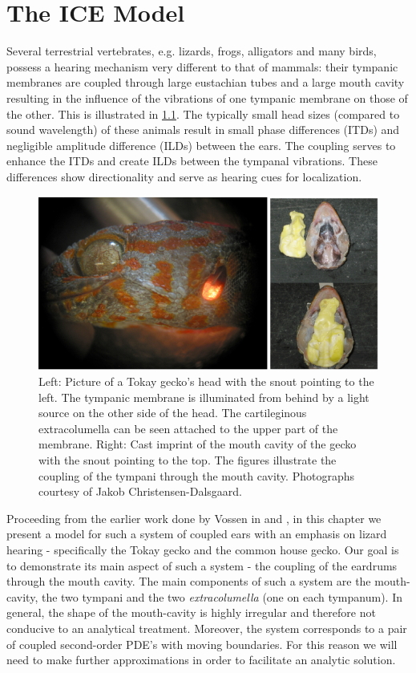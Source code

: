 \chapter{The ICE Model}
Several terrestrial vertebrates, e.g. lizards, frogs, alligators and many birds, possess a hearing mechanism very different to
that of mammals: their tympanic membranes are coupled through large eustachian tubes and a large mouth cavity resulting in the influence of the vibrations of one tympanic membrane
on those of the other. This is illustrated in \ref{geckohead}. The typically small head sizes (compared to sound wavelength) of these animals result in
small phase differences (ITDs) and negligible amplitude difference (ILDs) between the ears. The coupling serves to enhance the ITDs and create ILDs
between the tympanal vibrations. These differences show directionality and serve as hearing cues for localization.

\begin{figure}[ht!]
 \centering
 \includegraphics[width=.85\linewidth]{Diagrams/geckohead1.png}
 \caption[Illustration of a gecko's head]{Left: Picture of a Tokay gecko's head with the snout pointing to the left. The tympanic membrane is illuminated from behind by
 a light source on the other side of the head. The cartileginous extracolumella can be seen attached to the upper part of the membrane.
 Right: Cast imprint of the mouth cavity of the gecko with the snout pointing to the top. The figures illustrate the coupling of the tympani through the mouth cavity.
 Photographs courtesy of Jakob Christensen-Dalsgaard.}
  \label{geckohead}
\end{figure}

Proceeding from the earlier work done by Vossen in \cite{vossenthesis} and \cite{vossenjasa}, in this chapter we present a model for such a system of coupled ears with an emphasis on lizard hearing
- specifically the Tokay gecko and the common house gecko. Our goal is to demonstrate its main aspect of such a system - the coupling
of the eardrums through the mouth cavity. 
The main components of such a system are the mouth-cavity, the two tympani and the two \textit{extracolumella} (one on each tympanum). In general, the shape of the mouth-cavity is highly irregular and therefore
not conducive to an analytical treatment. Moreover, the system corresponds to a pair of coupled second-order PDE's with
moving boundaries. For this reason we will need to make further approximations in order to facilitate an
analytic solution.

